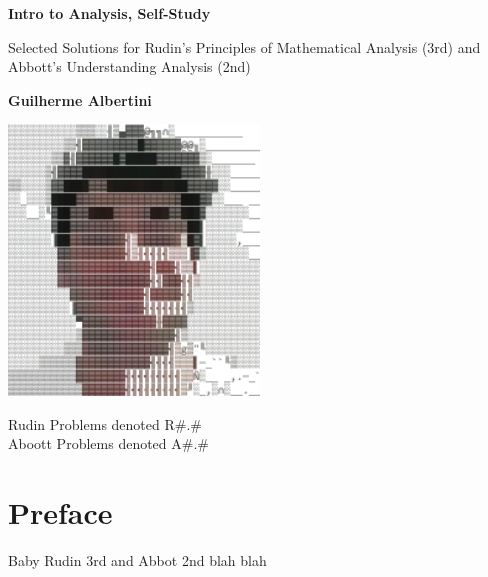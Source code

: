 \documentclass[titlepage]{book}
\begin{document}
\begin{titlepage}
    \begin{center}
        \vspace*{1cm}
            
        \Huge
        \textbf{Intro to Analysis, Self-Study}
            
        \vspace{0.5cm}
        \LARGE
        Selected Solutions for Rudin's Principles of Mathematical Analysis (3rd) and Abbott's Understanding Analysis (2nd)
            
        \vspace{1.5cm}
            
        \textbf{Guilherme Albertini}
            
        \vfill
            
            
        \vspace{0.8cm}
            
        \includegraphics[width=0.5\textwidth]{University_Logo.png}
            
        \Large
        Rudin Problems denoted R\#.\#\\
        Aboott Problems denoted A\#.\#\\
            
    \end{center}
\end{titlepage}

\frontmatter
\tableofcontents

\chapter*{Preface}

\TODO Baby Rudin 3rd and Abbot 2nd blah blah

\mainmatter


\end{document}
